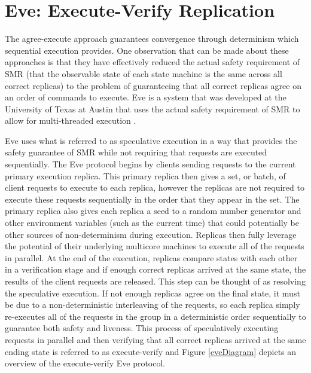 \documentclass[11pt, oneside]{report}
\begin{document}
\section{Eve: Execute-Verify Replication}
The agree-execute approach guarantees convergence through determinism which sequential execution provides. 
One observation that can be made about these approaches is that they have effectively reduced the actual safety requirement of SMR (that the observable state of each state machine is the same across all correct replicas) to the problem of guaranteeing that all correct replicas agree on an order of commands to execute. 
Eve is a system that was developed at the University of Texas at Austin that uses the actual safety requirement of SMR to allow for multi-threaded execution \cite{manosThesis, eve}.

Eve uses what is referred to as speculative execution \cite{eve, zyz} in a way that provides the safety guarantee of SMR while not requiring that requests are executed sequentially. 
The Eve protocol begins by clients sending requests to the current primary execution replica.
This primary replica then gives a set, or batch, of client requests to execute to each replica, however the replicas are not required to execute these requests sequentially in the order that they appear in the set. 
The primary replica also gives each replica a seed to a random number generator and other environment variables (such as the current time) that could potentially be other sources of non-determinism during execution.
Replicas then fully leverage the potential of their underlying multicore machines to execute all of the requests in parallel. 
At the end of the execution, replicas compare states with each other in a verification stage and if enough correct replicas arrived at the same state, the results of the client requests are released. 
This step can be thought of as resolving the speculative execution. 
If not enough replicas agree on the final state, it must be due to a non-deterministic interleaving of the requests, so each replica simply re-executes all of the requests in the group in a deterministic order sequentially to guarantee both safety and liveness. 
This process of speculatively executing requests in parallel and then verifying that all correct replicas arrived at the same ending state is referred to as execute-verify and Figure \ref{eveDiagram} depicts an overview of the execute-verify Eve protocol.
\end{document}
